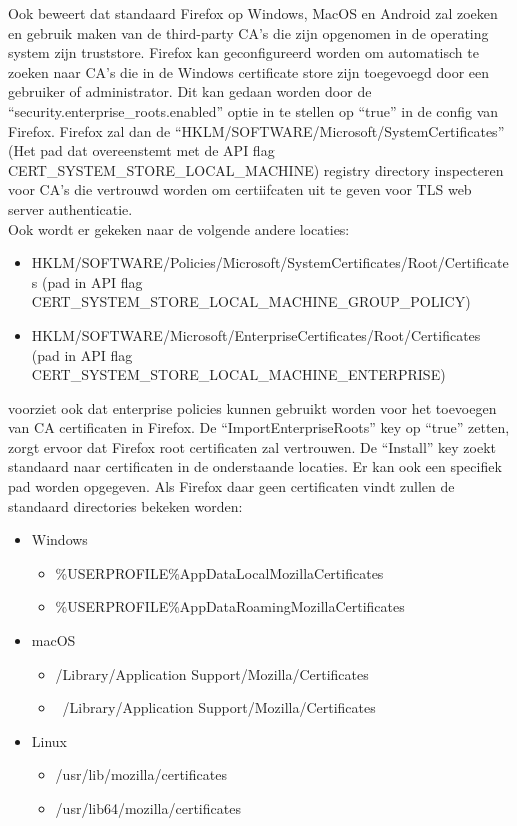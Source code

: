 Ook beweert \textcite{MozillaCA} dat standaard Firefox op Windows, MacOS en Android zal zoeken en gebruik maken van de third-party CA's die zijn opgenomen in de operating system zijn truststore.
Firefox kan geconfigureerd worden om automatisch te zoeken naar CA's die in de Windows certificate store zijn toegevoegd door een gebruiker of administrator. Dit kan gedaan worden door de ``security.enterprise\_roots.enabled'' optie in te stellen op ``true'' in de config van Firefox.
Firefox zal dan de ``HKLM/SOFTWARE/Microsoft/SystemCertificates'' (Het pad dat overeenstemt met de API flag CERT\_SYSTEM\_STORE\_LOCAL\_MACHINE) registry directory inspecteren voor CA's die vertrouwd worden om certiifcaten uit te geven voor TLS web server authenticatie. \autocite{MozillaCA} \\

Ook wordt er gekeken naar de volgende andere locaties:
\begin{itemize}
  \item HKLM/SOFTWARE/Policies/Microsoft/SystemCertificates/Root/Certificates (pad in API flag CERT\_SYSTEM\_STORE\_LOCAL\_MACHINE\_GROUP\_POLICY)
  \item HKLM/SOFTWARE/Microsoft/EnterpriseCertificates/Root/Certificates (pad in API flag CERT\_SYSTEM\_STORE\_LOCAL\_MACHINE\_ENTERPRISE)
\end{itemize}

\textcite{MozillaCA} voorziet ook dat enterprise policies kunnen gebruikt worden voor het toevoegen van CA certificaten in Firefox.
De ``ImportEnterpriseRoots'' key op ``true'' zetten, zorgt ervoor dat Firefox root certificaten zal vertrouwen.
De ``Install'' key zoekt standaard naar certificaten in de onderstaande locaties. Er kan ook een specifiek pad worden opgegeven. Als Firefox daar geen certificaten vindt zullen de standaard directories bekeken worden:
\begin{itemize}
  \item Windows
  \begin{itemize}
    \item \%USERPROFILE\%AppDataLocalMozillaCertificates 
    \item \%USERPROFILE\%AppDataRoamingMozillaCertificates
  \end{itemize}

  \item macOS
  \begin{itemize}
    \item /Library/Application Support/Mozilla/Certificates 
    \item ~/Library/Application Support/Mozilla/Certificates 
  \end{itemize}

  \item Linux 
  \begin{itemize}
    \item /usr/lib/mozilla/certificates 
    \item /usr/lib64/mozilla/certificates 
  \end{itemize}
\end{itemize} 

